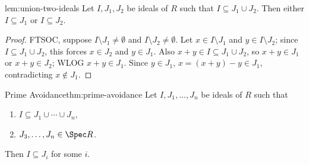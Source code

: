 \begin{lemma}{}{lem:union-two-ideals}
Let $I, J_1, J_2$ be ideals of $R$ such that $I \subseteq J_1 \cup J_2$. Then either $I \subseteq J_1$ or $I \subseteq J_2$.
\end{lemma}

\begin{proof}
FTSOC, suppose $I \setminus J_1 \neq \emptyset$ and $I \setminus J_2 \neq \emptyset$. Let $x \in I \setminus J_1$ and $y \in I \setminus J_2$; since $I \subseteq J_1 \cup J_2$, this forces $x \in J_2$ and $y \in J_1$. Also $x+y \in I \subseteq J_1 \cup J_2$, so $x+y \in J_1$ or $x+y \in J_2$; WLOG $x+y \in J_1$. Since $y \in J_1$, $x = (x+y) - y \in J_1$, contradicting $x \notin J_1$.
\end{proof}

\begin{theorem}{Prime Avoidance}{thm:prime-avoidance}
Let $I, J_1, \ldots, J_n$ be ideals of $R$ such that
\begin{enumerate}[label=(\arabic*)]
    \item $I \subseteq J_1 \cup \cdots \cup J_n$,
    \item $J_3, \ldots, J_n \in \Spec R$.
\end{enumerate}
Then $I \subseteq J_i$ for some $i$.
\end{theorem}

